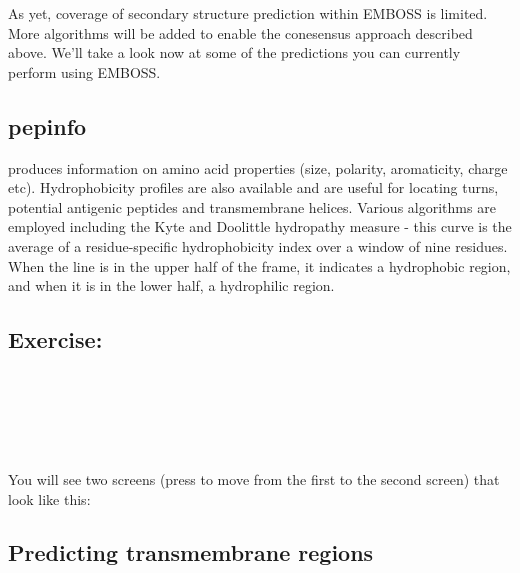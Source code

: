 \documentclass[12pt]{report}
\begin{document}
As yet,	coverage of secondary structure	prediction within EMBOSS is
limited. More algorithms will be added to enable the conesensus
approach described above. We'll	take a look now	at some	of the
predictions you	can currently perform using EMBOSS.

\subsection{pepinfo}

	produces information on	amino acid properties (size, polarity, aromaticity, charge
etc). Hydrophobicity profiles are also available and are useful	for
locating turns,	potential antigenic peptides and transmembrane
helices. Various algorithms are	employed including the Kyte and
Doolittle hydropathy measure - this curve is the average of a
residue-specific hydrophobicity	index over a window of nine residues.
When the line is in the	upper half of the frame, it indicates a
hydrophobic region, and	when it	is in the lower	half, a	hydrophilic
region.

\subsection*{Exercise: }

\unix{}\\
\\
\\
\\
\\
You will see two screens (press	 to move from the first
to the second screen) that look	like this:

\begin{figure}[H]
\begin{center}
\end{center}
\label{fig:pepinfo1}
\end{figure}

\begin{figure}[H]
\begin{center}
\end{center}
\label{fig:pepinfo2}
\end{figure}


\subsection{Predicting transmembrane regions}
\end{document}
